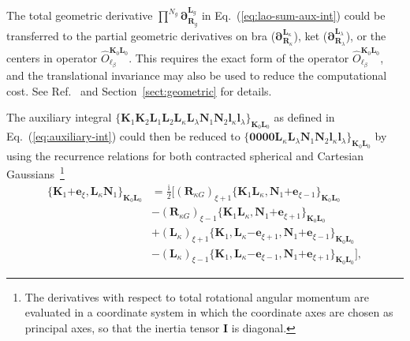 \documentclass[a4paper,11pt,twoside,openright]{book}
\begin{document}
The total geometric derivative $\prod^{N_{g}}\boldsymbol{\partial}_{\boldsymbol{R}_{g}}^{\boldsymbol{L}_{g}}$
in Eq.~(\ref{eq:lao-sum-aux-int}) could be transferred to the partial geometric derivatives on bra
($\boldsymbol{\partial}_{\boldsymbol{R}_{\kappa}}^{\boldsymbol{L}_{\kappa}}$), ket
($\boldsymbol{\partial}_{\boldsymbol{R}_{\lambda}}^{\boldsymbol{L}_{\lambda}}$),
or the centers in operator $\hat{O}_{\ell_{\beta}}^{\boldsymbol{K}_{0}\boldsymbol{L}_{0}}$.
This requires the exact form of the operator $\hat{O}_{\ell_{\beta}}^{\boldsymbol{K}_{0}\boldsymbol{L}_{0}}$,
and the translational invariance may also be used to reduce the computational cost. See
Ref.~\cite{bgkr} and Section~\ref{sect:geometric} for details.

The auxiliary integral $\{\boldsymbol{K}_{1}\boldsymbol{K}_{2}\boldsymbol{L}_{1}\boldsymbol{L}_{2}%
\boldsymbol{L}_{\kappa}\boldsymbol{L}_{\lambda}%
\boldsymbol{N}_{1}\boldsymbol{N}_{2}\boldsymbol{l}_{\kappa}%
\boldsymbol{l}_{\lambda}\}_{\boldsymbol{K}_{0}\boldsymbol{L}_{0}}$
as defined in Eq.~(\ref{eq:auxiliary-int}) could then be reduced to $\{\boldsymbol{0000}%
\boldsymbol{L}_{\kappa}\boldsymbol{L}_{\lambda}\boldsymbol{N}_{1}\boldsymbol{N}_{2}%
\boldsymbol{l}_{\kappa}\boldsymbol{l}_{\lambda}\}_{\boldsymbol{K}_{0}\boldsymbol{L}_{0}}$
by using the recurrence relations for both contracted spherical and Cartesian
Gaussians~\cite{bgkrth-a,bgkr}\footnote{The derivatives with respect to total rotational
angular momentum are evaluated in a coordinate system in which the coordinate axes are
chosen as principal axes, so that the inertia tensor $\mathbf{I}$ is diagonal.}
\begin{align}
  \label{eq:recurrence-mag-bra}
  \{\boldsymbol{K}_{1}\mathrm{+}\boldsymbol{e}_{\xi},%
    \boldsymbol{L}_{\kappa}\boldsymbol{N}_{1}\}_{\boldsymbol{K}_{0}\boldsymbol{L}_{0}}
  &=\tfrac{\text{i}}{2}\bigl[(\boldsymbol{R}_{\kappa G})_{\xi+1}%
    \{\boldsymbol{K}_{1}\boldsymbol{L}_{\kappa},%
      \boldsymbol{N}_{1}\mathrm{+}\boldsymbol{e}_{\xi-1}\}_{\boldsymbol{K}_{0}\boldsymbol{L}_{0}}\\
  &-(\boldsymbol{R}_{\kappa G})_{\xi-1}%
    \{\boldsymbol{K}_{1}\boldsymbol{L}_{\kappa},%
      \boldsymbol{N}_{1}\mathrm{+}\boldsymbol{e}_{\xi+1}\}_{\boldsymbol{K}_{0}\boldsymbol{L}_{0}}\nonumber\\
  &+(\boldsymbol{L}_{\kappa})_{\xi+1}%
    \{\boldsymbol{K}_{1},\boldsymbol{L}_{\kappa}\mathrm{-}\boldsymbol{e}_{\xi+1},%
      \boldsymbol{N}_{1}\mathrm{+}\boldsymbol{e}_{\xi-1}\}_{\boldsymbol{K}_{0}\boldsymbol{L}_{0}}\nonumber\\
  &-(\boldsymbol{L}_{\kappa})_{\xi-1}%
    \{\boldsymbol{K}_{1},\boldsymbol{L}_{\kappa}\mathrm{-}\boldsymbol{e}_{\xi-1},%
      \boldsymbol{N}_{1}\mathrm{+}\boldsymbol{e}_{\xi+1}\}_{\boldsymbol{K}_{0}\boldsymbol{L}_{0}}\bigr],\nonumber
\end{align}
\end{document}
